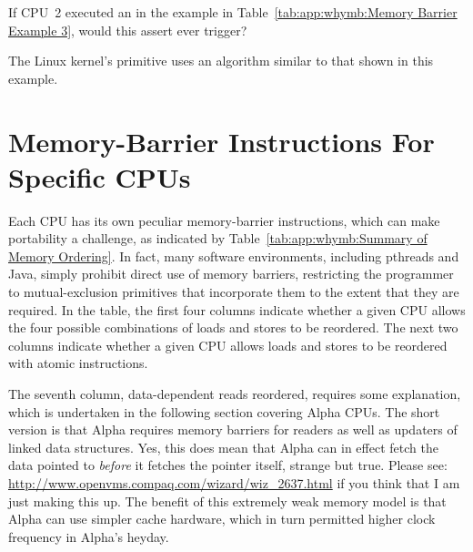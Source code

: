 \QuickQuiz{}
	If CPU~2 executed an  in the example in
	Table~\ref{tab:app:whymb:Memory Barrier Example 3},
	would this assert ever trigger?
 \QuickQuizEnd

The Linux kernel's  primitive uses an algorithm
similar to that shown in this example.

\section{Memory-Barrier Instructions For Specific CPUs}
\label{sec:app:whymb:Memory-Barrier Instructions For Specific CPUs}

Each CPU has its own peculiar memory-barrier instructions, which
can make portability a challenge, as indicated by
Table~\ref{tab:app:whymb:Summary of Memory Ordering}.
In fact, many software environments,
including pthreads and Java, simply prohibit
direct use of memory barriers, restricting the programmer to mutual-exclusion
primitives that incorporate them to the extent that they are required.
In the table,
the first four columns indicate whether a given CPU allows the four
possible combinations of loads and stores to be reordered.
The next two columns indicate whether a given CPU allows loads and stores
to be reordered with atomic instructions.

The seventh column, data-dependent reads reordered, requires some explanation,
which is undertaken in the following section covering Alpha CPUs.
The short version is that Alpha requires memory barriers for readers
as well as updaters of linked data structures.
Yes, this does mean that Alpha can in effect fetch
the data pointed to {\em before} it fetches the pointer itself, strange
but true.
Please see:
\url{http://www.openvms.compaq.com/wizard/wiz_2637.html}
if you think that I am just making this up.
The benefit of this extremely weak memory model is that Alpha can use
simpler cache hardware, which in turn permitted higher clock frequency
in Alpha's heyday.

